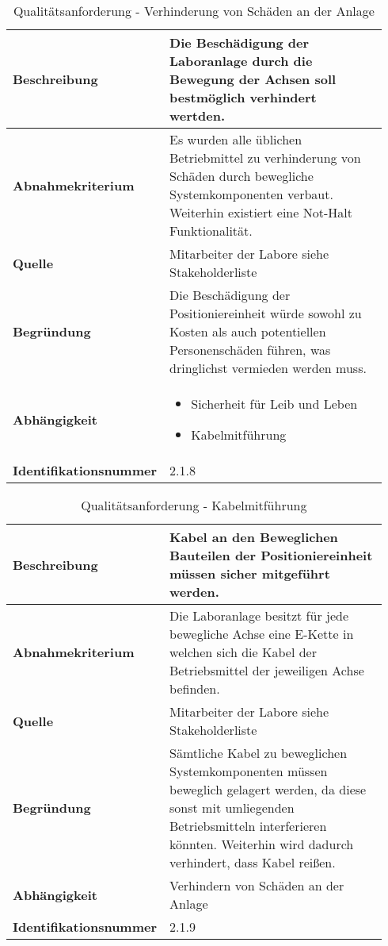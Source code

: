 \documentclass[../../../Bachelorarbeit.tex]{subfiles}
\begin{document}
\begin{table}[H]
    \centering
    \begin{tabular}{| p{0.34\linewidth} | p{0.6\linewidth} |}
        \hline
        \textbf{Beschreibung} & Die Beschädigung der Laboranlage durch die Bewegung der Achsen soll bestmöglich verhindert wertden. \\ \hline
        \textbf{Abnahmekriterium} & Es wurden alle üblichen Betriebmittel zu verhinderung von Schäden durch bewegliche Systemkomponenten verbaut. Weiterhin existiert eine Not-Halt Funktionalität. \\ \hline
        \textbf{Quelle} & Mitarbeiter der Labore siehe Stakeholderliste \\ \hline
        \textbf{Begründung} & Die Beschädigung der Positioniereinheit würde sowohl zu Kosten als auch potentiellen Personenschäden führen, was dringlichst vermieden werden muss. \\ \hline
        \textbf{Abhängigkeit} & {\begin{itemize}[noitemsep,topsep=0pt,parsep=0pt,partopsep=0pt,leftmargin=*]
                                    \item Sicherheit für Leib und Leben
                                    \item Kabelmitführung
                                \end{itemize}} \\ \hline
        \textbf{Identifikationsnummer} & 2.1.8 \\ \hline
    \end{tabular}
    \caption[\acs{nfa} - Verhinderung von Schäden an der Anlage]{Qualitätsanforderung - Verhinderung von Schäden an der Anlage}
    \label{tab:my-table18}
\end{table}

\begin{table}[H]
    \centering
    \begin{tabular}{| p{0.34\linewidth} | p{0.6\linewidth} |}
        \hline
        \textbf{Beschreibung} & Kabel an den Beweglichen Bauteilen der Positioniereinheit müssen sicher mitgeführt werden. \\ \hline
        \textbf{Abnahmekriterium} & Die Laboranlage besitzt für jede bewegliche Achse eine E-Kette in welchen sich die Kabel der Betriebsmittel der jeweiligen Achse befinden. \\ \hline
        \textbf{Quelle} & Mitarbeiter der Labore siehe Stakeholderliste \\ \hline
        \textbf{Begründung} & Sämtliche Kabel zu beweglichen Systemkomponenten müssen beweglich gelagert werden, da diese sonst mit umliegenden Betriebsmitteln interferieren könnten. Weiterhin wird dadurch verhindert, dass Kabel reißen. \\ \hline
        \textbf{Abhängigkeit} & Verhindern von Schäden an der Anlage \\ \hline
        \textbf{Identifikationsnummer} & 2.1.9 \\ \hline
    \end{tabular}
    \caption[\acs{nfa} - Kabelmitführung]{Qualitätsanforderung - Kabelmitführung}
    \label{tab:my-table19}
\end{table}
\end{document}
